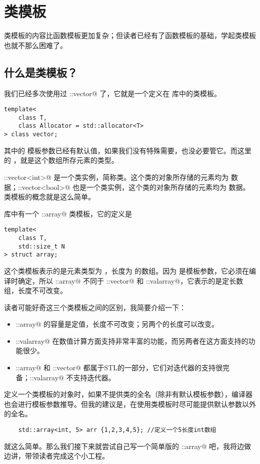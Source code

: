 \section{类模板}
类模板的内容比函数模板更加复杂；但读者已经有了函数模板的基础，学起类模板也就不那么困难了。\par
\subsection*{什么是类模板？}
我们已经多次使用过 \lstinline@std::vector@ 了，它就是一个定义在 \lstinline@vector@ 库中的类模板。
\begin{lstlisting}
template<
    class T,
    class Allocator = std::allocator<T>
> class vector;
\end{lstlisting}
其中的 \lstinline@Allocator@ 模板参数已经有默认值，如果我们没有特殊需要，也没必要管它。而这里的 \lstinline@T@，就是这个数组所存元素的类型。\par
\lstinline@std::vector<int>@ 是一个类实例，简称类。这个类的对象所存储的元素均为 \lstinline@int@ 数据；\lstinline@std::vector<bool>@ 也是一个类实例，这个类的对象所存储的元素均为 \lstinline@bool@ 数据。类模板的概念就是这么简单。\par
\lstinline@array@ 库中有一个 \lstinline@std::array@ 类模板，它的定义是
\begin{lstlisting}
template<
    class T,
    std::size_t N
> struct array;
\end{lstlisting}
这个类模板表示的是元素类型为 \lstinline@T@，长度为 \lstinline@N@ 的数组。因为 \lstinline@N@ 是模板参数，它必须在编译时确定，所以 \lstinline@std::array@ 不同于 \lstinline@std::vector@ 和 \lstinline@std::valarray@，它表示的是定长数组，长度不可改变。\par
读者可能好奇这三个类模板之间的区别，我简要介绍一下：
\begin{itemize}
    \item \lstinline@std::array@ 的容量是定值，长度不可改变；另两个的长度可以改变。
    \item \lstinline@std::valarray@ 在数值计算方面支持非常丰富的功能，而另两者在这方面支持的功能很少。
    \item \lstinline@std::array@ 和 \lstinline@std::vector@ 都属于STL的一部分，它们对迭代器的支持很完备；\lstinline@std::valarray@ 不支持迭代器。
\end{itemize}
定义一个类模板的对象时，如果不提供类的全名（除非有默认模板参数），编译器也会进行模板参数推导。但我的建议是，在使用类模板时尽可能提供默认参数以外的全名。
\begin{lstlisting}
    std::array<int, 5> arr {1,2,3,4,5}; //定义一个5长度int数组
\end{lstlisting}
就这么简单。那么我们接下来就尝试自己写一个简单版的 \lstinline@user::array@ 吧，我将边做边讲，带领读者完成这个小工程。
